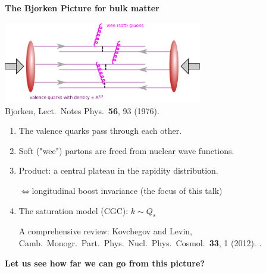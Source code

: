 \documentclass[9pt,a4paper,unknownkeysallowed,xcolor=dvipsnames,aspectratio=43]{beamer}
\begin{document}
%
%
\begin{frame}{\bf\huge The Bjorken Picture for bulk matter}	\vspace{4mm}
\begin{center}
\includegraphics[width=0.65\textwidth]{fig/Bjorken}\\
{\tiny  {\color{teablue}
Bjorken,
  Lect.\ Notes Phys.\  {\bf 56}, 93 (1976).
  }}
\end{center}
\begin{enumerate}
\item{\large The valence quarks pass through each other.}
\vspace{2mm}
\item{\large Soft ("wee") partons are freed from nuclear wave functions.}
\vspace{2mm}
\item{\large Product: a central plateau in the rapidity distribution.}\\
\vspace{1mm}
\begin{center}
    {\color{darkred}$\Leftrightarrow$longitudinal boost invariance} (the focus of this talk)
\end{center}
\vspace{1mm}
\item{\large The saturation model (CGC): $k\sim Q_s$}
\begin{center}
    {\tiny  A comprehensive review: {\color{teablue}
  Kovchegov and Levin,
  Camb.\ Monogr.\ Part.\ Phys.\ Nucl.\ Phys.\ Cosmol.\  {\bf 33}, 1 (2012).
.
  }}
\end{center}
\end{enumerate}
\vspace{1mm}
\begin{center}
{\bf\large\color{darkred} Let us see how far we can go from this picture?}
\end{center}
\end{frame}
\end{document}
